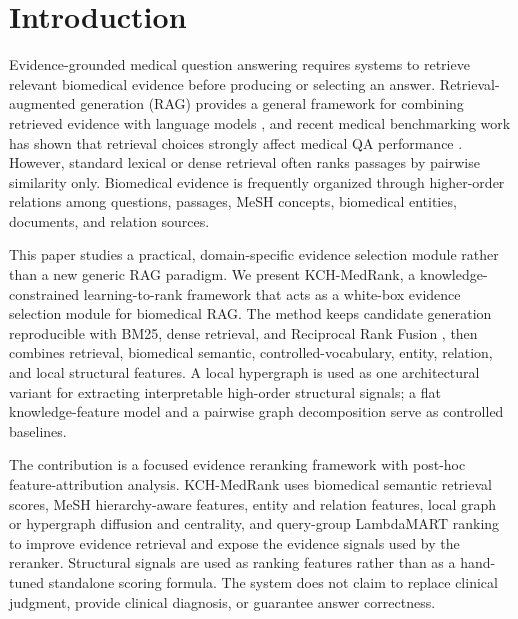 \section{Introduction}

Evidence-grounded medical question answering requires systems to retrieve relevant biomedical evidence before producing or selecting an answer. Retrieval-augmented generation (RAG) provides a general framework for combining retrieved evidence with language models \citep{lewis2020rag}, and recent medical benchmarking work has shown that retrieval choices strongly affect medical QA performance \citep{xiong2024benchmarking}. However, standard lexical or dense retrieval often ranks passages by pairwise similarity only. Biomedical evidence is frequently organized through higher-order relations among questions, passages, MeSH concepts, biomedical entities, documents, and relation sources.

This paper studies a practical, domain-specific evidence selection module rather than a new generic RAG paradigm. We present KCH-MedRank, a knowledge-constrained learning-to-rank framework that acts as a white-box evidence selection module for biomedical RAG. The method keeps candidate generation reproducible with BM25, dense retrieval, and Reciprocal Rank Fusion \citep{robertson2009bm25,cormack2009rrf}, then combines retrieval, biomedical semantic, controlled-vocabulary, entity, relation, and local structural features. A local hypergraph is used as one architectural variant for extracting interpretable high-order structural signals; a flat knowledge-feature model and a pairwise graph decomposition serve as controlled baselines.

The contribution is a focused evidence reranking framework with post-hoc feature-attribution analysis. KCH-MedRank uses biomedical semantic retrieval scores, MeSH hierarchy-aware features, entity and relation features, local graph or hypergraph diffusion and centrality, and query-group LambdaMART ranking to improve evidence retrieval and expose the evidence signals used by the reranker. Structural signals are used as ranking features rather than as a hand-tuned standalone scoring formula. The system does not claim to replace clinical judgment, provide clinical diagnosis, or guarantee answer correctness.

